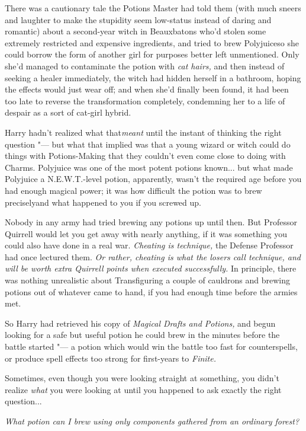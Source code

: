 There was a cautionary tale the Potions Master had told them (with much
sneers and laughter to make the stupidity seem low-status instead of
daring and romantic) about a second-year witch in Beauxbatons who'd
stolen some extremely restricted and expensive ingredients, and tried to
brew Polyjuiceso she could borrow the form of another girl for purposes
better left unmentioned. Only she'd managed to contaminate the potion
with \emph{cat hairs,} and then instead of seeking a healer immediately,
the witch had hidden herself in a bathroom, hoping the effects would
just wear off; and when she'd finally been found, it had been too late
to reverse the transformation completely, condemning her to a life of
despair as a sort of cat-girl hybrid.

Harry hadn't realized what that\emph{meant} until the instant of
thinking the right question "--- but what that implied was that a young
wizard or witch could do things with Potions-Making that they couldn't
even come close to doing with Charms. Polyjuice was one of the most
potent potions known... but what made Polyjuice a N.E.W.T.-level
potion, apparently, wasn't the required age before you had enough
magical power; it was how difficult the potion was to brew preciselyand
what happened to you if you screwed up.

Nobody in any army had tried brewing any potions up until then. But
Professor Quirrell would let you get away with nearly anything, if it
was something you could also have done in a real war. \emph{Cheating is
technique,} the Defense Professor had once lectured them. \emph{Or
rather, cheating is what the losers call technique, and will be worth
extra Quirrell points when executed successfully.} In principle, there
was nothing unrealistic about Transfiguring a couple of cauldrons and
brewing potions out of whatever came to hand, if you had enough time
before the armies met.

So Harry had retrieved his copy of \emph{Magical Drafts and Potions,}
and begun looking for a safe but useful potion he could brew in the
minutes before the battle started "--- a potion which would win the battle
too fast for counterspells, or produce spell effects too strong for
first-years to \emph{Finite.}

Sometimes, even though you were looking straight at something, you
didn't realize \emph{what} you were looking at until you happened to ask
exactly the right question...

\emph{What potion can I brew using only components gathered from an
ordinary forest?}

